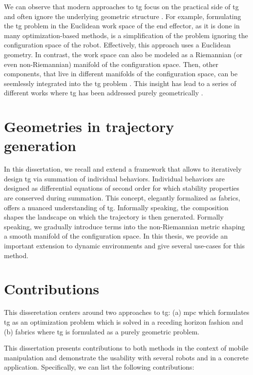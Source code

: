 We can observe that modern approaches to \ac{tg} focus on the
practical side of \ac{tg} and often ignore the underlying
geometric structure \cite{Ratliff2015}. For example,
formulating the \ac{tg} problem in the Euclidean work space
of the end effector, as it is done 
in many optimization-based methods, is a simplification of 
the problem ignoring the configuration space of the robot.
Effectively, this approach uses a Euclidean geometry.
In contrast, the work space can also be modeled as a
Riemannian (or even non-Riemannian) manifold of the
configuration space. Then, other components, that live in 
different manifolds of the configuration space, can be
seemlessly integrated into the \ac{tg} problem \cite{Ratliff2015}.
This insight has lead to a series of different works
where \ac{tg} has been addressed purely geometrically
\cite{Ratliff2015,Cheng2019,Cheng2020,Ratliff2020,Xie2020}.

\section{Geometries in trajectory generation}
\label{sec:geometries_in_trajectory_generation}

In this dissertation, we recall and extend a framework
that allows to iteratively design \ac{tg} via
summation of individual behaviors. Individual behaviors are
designed as differential equations of second order for which
stability properties are conserved during summation.
This concept, elegantly formalized as \ac{fabrics}, offers
a nuanced understanding of \ac{tg}.
Informally speaking, the composition shapes the
landscape on which the trajectory is then generated.
Formally speaking, we gradually introduce terms into the
non-Riemannian metric shaping a smooth manifold of the
configuration space. In this thesis, we provide an important
extension to dynamic environments and give several use-cases
for this method.

\section{Contributions}
\label{sec:contributions}

This disseretation centers around two approaches to
\ac{tg}: (a) \ac{mpc} which formulates
\ac{tg} as an optimization problem which is
solved in a receding horizon fashion and (b) \ac{fabrics}
where \ac{tg} is formulated as a 
purely geometric problem.

This dissertation presents contributions to both methods in
the context of mobile manipulation and demonstrate the
usability with several robots and in a concrete application.
Specifically, we can list the following contributions:

